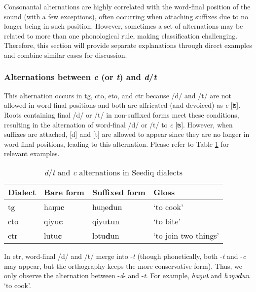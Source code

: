 Consonantal alternations are highly correlated with the word-final position of the sound (with a few exceptions), often occurring when attaching suffixes due to no longer being in such position. However, sometimes a set of alternations may be related to more than one phonological rule, making classification challenging. Therefore, this section will provide separate explanations through direct examples and combine similar cases for discussion.

\subsubsection{Alternations between \textit{c} (or \textit{t}) and \textit{d}/\textit{t}} \label{sec:dtc_alt}

This alternation occurs in \acl{tg}, \acl{cto}, \acl{eto}, and \acl{ctr} because /d/ and /t/ are not allowed in word-final positions and both are affricated (and devoiced) as \textit{c} [ʦ]. Roots containing final /d/ or /t/ in non-suffixed forms meet these conditions, resulting in the alternation of word-final /d/ or /t/ to \textit{c} [ʦ]. However, when suffixes are attached, [d] and [t] are allowed to appear since they are no longer in word-final positions, leading to this alternation. Please refer to Table \ref{tab:dtc_alt} for relevant examples.

\begin{table}[!htbp]
\centering
\caption{\textit{d}/\textit{t} and \textit{c} alternations in Seediq dialects}
\label{tab:dtc_alt}
\begin{tabular}{llll}
\hline
Dialect   & Bare form & Suffixed form & Gloss                \\ \hline
\acl{tg}  & haŋu\textbf{c}     & huŋe\textbf{d}un       & `to cook'            \\
\acl{cto} & qiyu\textbf{c}     & qiyu\textbf{t}un       & `to bite'            \\
\acl{ctr} & lutu\textbf{c}     & lətu\textbf{d}un       & `to join two things' \\ \hline
\end{tabular}
\end{table}

In \acl{etr}, word-final /d/ and /t/ merge into -\textit{t} (though phonetically, both -\textit{t} and -\textit{c} may appear, but the orthography keeps the more conservative form). Thus, we only observe the alternation between -\textit{d}- and -\textit{t}. For example, \textit{haŋu\textbf{t}} and \textit{həŋə\textbf{d}un} `to cook'.

